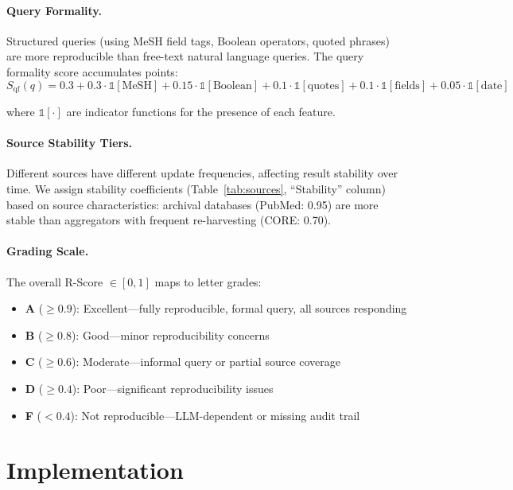 \documentclass[11pt,a4paper]{article}
\begin{document}
\paragraph{Query Formality.}
Structured queries (using MeSH field tags, Boolean operators, quoted phrases) are more reproducible than free-text natural language queries.
The query formality score accumulates points:
\begin{equation}
S_{\text{qf}}(q) = 0.3 + 0.3 \cdot \mathbb{1}[\text{MeSH}] + 0.15 \cdot \mathbb{1}[\text{Boolean}] + 0.1 \cdot \mathbb{1}[\text{quotes}] + 0.1 \cdot \mathbb{1}[\text{fields}] + 0.05 \cdot \mathbb{1}[\text{date}]
\label{eq:formality}
\end{equation}

where $\mathbb{1}[\cdot]$ are indicator functions for the presence of each feature.

\paragraph{Source Stability Tiers.}
Different sources have different update frequencies, affecting result stability over time.
We assign stability coefficients (Table~\ref{tab:sources}, ``Stability'' column) based on source characteristics: archival databases (PubMed: 0.95) are more stable than aggregators with frequent re-harvesting (CORE: 0.70).

\paragraph{Grading Scale.}
The overall R-Score $\in [0, 1]$ maps to letter grades:
\begin{itemize}
    \item \textbf{A} ($\geq 0.9$): Excellent---fully reproducible, formal query, all sources responding
    \item \textbf{B} ($\geq 0.8$): Good---minor reproducibility concerns
    \item \textbf{C} ($\geq 0.6$): Moderate---informal query or partial source coverage
    \item \textbf{D} ($\geq 0.4$): Poor---significant reproducibility issues
    \item \textbf{F} ($< 0.4$): Not reproducible---LLM-dependent or missing audit trail
\end{itemize}

\section{Implementation}
\label{sec:implementation}
\end{document}
